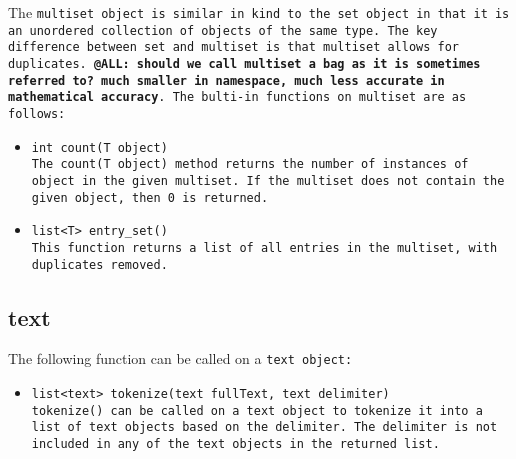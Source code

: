 \documentclass{book}
\begin{document}
The \tt multiset \rm object is similar in kind to the \tt set \rm object in that
it is an unordered collection of objects of the same type. The key difference
between \tt set \rm and \tt multiset \rm is that \tt multiset \rm allows for
duplicates. \textbf{@ALL: should we call multiset a \tt bag \rm as it is sometimes
referred to? much smaller in namespace, much less accurate in mathematical accuracy}.
The bulti-in functions on \tt multiset \rm are as follows:

\begin{itemize}

\item[] \tt int count(T object) \rm \\

The \tt count(T object) \rm method returns the number of instances of \tt object \rm
in the given \tt multiset\rm. If the \tt multiset \rm does not contain the given
object, then \tt 0 \rm is returned. 

\item[] \tt list<T> entry\_set() \rm \\

This function returns a list of all entries in the multiset, with duplicates removed.


\end{itemize}


\subsection{text} %
\label{sub:text}

The following function can be called on a \tt text \rm object:

\begin{itemize}

\item[] \tt list<text> tokenize(text fullText, text delimiter) \rm \\

\tt tokenize() \rm can be called on a \tt text \rm object to tokenize it into a
list of \tt text \rm objects based on the delimiter. The delimiter is not included
in any of the \tt text \rm objects in the returned list.

\end{itemize}



\end{document}
